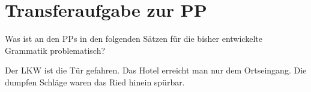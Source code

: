 \section{Transferaufgabe zur PP}

Was ist an den PPs in den folgenden Sätzen für die bisher entwickelte Grammatik problematisch?

\Halbzeile


\begin{exe}
  \ex Der LKW ist  die Tür gefahren.
  \ex Das Hotel erreicht man nur  dem Ortseingang.
  \ex Die dumpfen Schläge waren  das Ried hinein spürbar.
\end{exe}

\newpage\hspace{1em}


